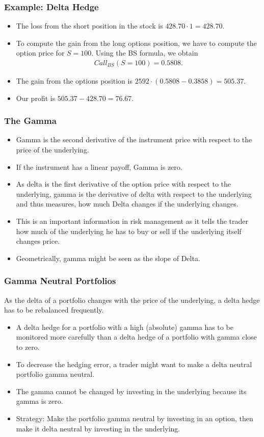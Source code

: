 \begin{frame}[fragile]
\frametitle{Example: Delta Hedge}
\begin{itemize}
  \item The loss from the short position in the stock is $428.70 \cdot
  1=428.70$.
  \item To compute the gain from the long options position, we have to compute
  the option price for $S=100$. Using the BS formula, we obtain
  \begin{align*}
    Call_{BS}(S=100) = 0.5808.
  \end{align*}
  \item The gain from the options position is $2592\cdot(0.5808-0.3858)=505.37$.
  \item Our profit is $505.37-428.70=76.67$.
\end{itemize}
\end{frame}

\begin{frame}[fragile]
\frametitle{The Gamma}
\begin{itemize}
  \item Gamma is the second derivative of the instrument price with respect to
  the price of the underlying.
  \item If the instrument has a linear payoff, Gamma is zero.
  \item As delta is the first derivative of the option price with respect to the
  underlying, gamma is the derivative of delta with respect to the underlying
  and thus measures, how much Delta changes if the underlying changes.
  \item This is an important information in risk management as it tells the
  trader how much of the underlying he has to buy or sell if the underlying
  itself changes price.
  \item Geometrically, gamma might be seen as the slope of Delta.
\end{itemize}
\end{frame}

\begin{frame}[fragile]
\frametitle{Gamma Neutral Portfolios}
As the delta of a portfolio changes with the price of the underlying, a delta
hedge has to be rebalanced frequently.
\begin{itemize}
  \item A delta hedge for a portfolio with a high (absolute) gamma has to be
  monitored more carefully than a delta hedge of a portfolio with gamma close to
  zero.
  \item To decrease the hedging error, a trader might want to make a delta
  neutral portfolio gamma neutral.
  \item The gamma cannot be changed by investing in the underlying because its
  gamma is zero.
  \item Strategy: Make the portfolio gamma neutral by investing in an option,
  then make it delta neutral by investing in the underlying.
\end{itemize}
\end{frame}


